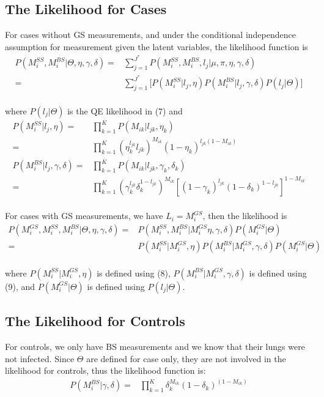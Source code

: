\documentclass[11 pt, a4paper]{article}  %
\begin{document}
\subsection{The Likelihood for Cases}
For cases without GS measurements, and under the conditional independence assumption for measurement given the latent variables, the likelihood function is
\begin{align*}
 P(M_i^{SS},M_i^{BS} | \Theta, \eta, \gamma, \delta) 
 = & \sum_{j = 1}^{J^*}  P(M_i^{SS},M_i^{BS}, l_j | \mu, \pi, \eta, \gamma, \delta)  \\ 
= & \sum_{j = 1}^{J^*} \big[ P(M_i^{SS} | l_j, \eta) P(M_i^{BS} | l_j, \gamma, \delta) P(l_j |\Theta) \big ] 
\end{align*}
\\
where $P(l_j |\Theta)$ is the QE likelihood in (7) and
\begin{align}
P(M_i^{SS} | l_j, \eta) = & \prod_{k=1}^K P(M_{ik} | l_{jk}, \eta_k) \nonumber \\
 = & \prod_{k=1}^K (\eta_k^{l_{jk}}l_{jk})^{M_{ik}} (1-\eta_k)^{l_{jk}(1-M_{ik})}\\
P(M_i^{BS} | l_j, \gamma, \delta) = & \prod_{k=1}^K P(M_{ik} | l_{jk}, \gamma_k, \delta_k) \nonumber \\
 = & \prod_{k=1}^K (\gamma_k^{l_{jk}} \delta_k^{1-l_{jk}})^{M_{ik}} [(1-\gamma_k)^{l_{jk}} (1-\delta_k)^{1-l_{jk}}]^{1-M_{ik}}
\end{align}
\\
For cases with GS measurements, we have $L_i = M_i^{GS}$, then the likelihood is 
\begin{align*}
 P(M_i^{GS},M_i^{SS},M_i^{BS} | \Theta, \eta, \gamma, \delta) 
= & P(M_i^{SS},M_i^{BS} | M_i^{GS} \eta, \gamma, \delta) P(M_i^{GS} | \Theta)\\
= & P(M_i^{SS}| M_i^{GS}, \eta) P(M_i^{BS} | M_i^{GS}, \gamma, \delta) P(M_i^{GS} | \Theta)
\end{align*}
\\
where $P(M_i^{SS}| M_i^{GS}, \eta)$ is defined using (8), $P(M_i^{BS} | M_i^{GS}, \gamma, \delta)$ is defined using (9), and $P(M_i^{GS} | \Theta)$ is defined using $P(l_j |\Theta)$.\\

\subsection{The Likelihood for Controls}
For controls, we only have BS measurements and we know that their lungs were not infected. Since $\Theta$ are defined for case only, they are not involved in the likelihood for controls, thus the likelihood function is:
\begin{align}
 P(M_i^{BS} |\gamma, \delta) = & \prod_{k=1}^K \delta_k^{M_{ik}}(1-\delta_k)^{(1-M_{ik})}
\end{align}
\\
\end{document}
